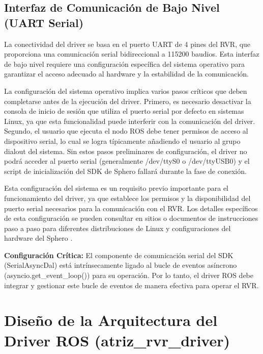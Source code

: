\documentclass[11pt]{article}
\numberwithin{figure}{section}
\numberwithin{table}{section}
\begin{document}
\subsection{Interfaz de Comunicación de Bajo Nivel (UART Serial)}

La conectividad del driver se basa en el puerto UART de 4 pines del RVR, que proporciona una comunicación serial bidireccional a 115200 baudios. Esta interfaz de bajo nivel requiere una configuración específica del sistema operativo para garantizar el acceso adecuado al hardware y la estabilidad de la comunicación.

La configuración del sistema operativo implica varios pasos críticos que deben completarse antes de la ejecución del driver. Primero, es necesario desactivar la consola de inicio de sesión que utiliza el puerto serial por defecto en sistemas Linux, ya que esta funcionalidad puede interferir con la comunicación del driver. Segundo, el usuario que ejecuta el nodo ROS debe tener permisos de acceso al dispositivo serial, lo cual se logra típicamente añadiendo el usuario al grupo dialout del sistema. Sin estos pasos preliminares de configuración, el driver no podrá acceder al puerto serial (generalmente /dev/ttyS0 o /dev/ttyUSB0) y el script de inicialización del SDK de Sphero fallará durante la fase de conexión.

Esta configuración del sistema es un requisito previo importante para el funcionamiento del driver, ya que establece los permisos y la disponibilidad del puerto serial necesarios para la comunicación con el RVR. Los detalles específicos de esta configuración se pueden consultar en sitios o documentos de instrucciones paso a paso para diferentes distribuciones de Linux y configuraciones del hardware del Sphero \cite{Sphero_RVR_Plus}.

\begin{infobox}
\textbf{Configuración Crítica:} El componente de comunicación serial del SDK (SerialAsyncDal) está intrínsecamente ligado al bucle de eventos asíncrono (asyncio.get\_event\_loop()) para su operación. Por lo tanto, el driver ROS debe integrar y gestionar este bucle de eventos de manera efectiva para operar el RVR.
\end{infobox}


\newpage


\section{Diseño de la Arquitectura del Driver ROS (atriz\_rvr\_driver)}
\end{document}
